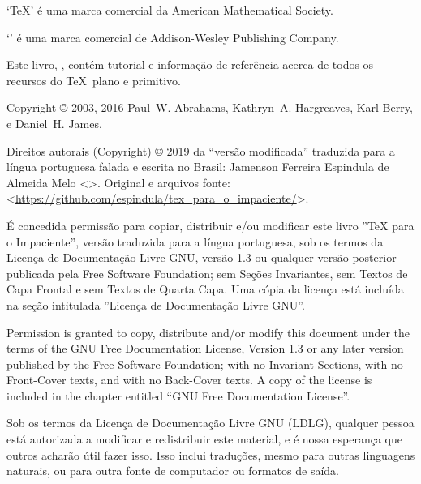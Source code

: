 



% 
\noheadlinetrue
\sinkage

\noindent `\TeX' é uma marca comercial da American Mathematical Society.

\noindent `\Metafont' é uma marca comercial de Addison-Wesley Publishing 
Company.

\bigskip
\noindent Este livro, \thisbook, contém tutorial e informação de 
referência acerca de todos os recursos do \TeX\ plano e primitivo.

\bigskip

\noindent Copyright \copyright{} 2003, 2016 Paul~W. Abrahams,
Kathryn~A. Hargreaves, Karl Berry, e Daniel~H. James.

\noindent Direitos autorais (Copyright) \copyright{} 2019 da 
``versão modificada'' traduzida para a língua portuguesa falada e 
escrita no Brasil: Jamenson Ferreira Espindula de Almeida Melo 
<>.
Original e arquivos fonte: 
<\url{https://github.com/espindula/tex_para_o_impaciente/}>.

\bigskip
\noindent   É concedida permissão para copiar, distribuir e/ou modificar 
este livro ''TeX para o Impaciente'', versão traduzida para a língua 
portuguesa, sob os termos da Licença de Documentação Livre GNU, versão 
1.3 ou qualquer versão posterior publicada pela Free Software 
Foundation; sem Seções Invariantes, sem Textos de Capa Frontal e sem 
Textos de Quarta Capa.   Uma cópia da licença está incluída na seção 
intitulada ''Licença de Documentação Livre GNU''.

\medskip\noindent
Permission is granted to copy, distribute and/or modify this
document under the terms of the GNU Free Documentation License, Version
1.3 or any later version published by the Free Software Foundation; with
no Invariant Sections, with no Front-Cover texts, and with no Back-Cover
texts.  A copy of the license is included in the chapter entitled ``GNU
Free Documentation License''.

\medskip\noindent
Sob os termos da Licença de Documentação Livre GNU (LDLG), qualquer 
pessoa está autorizada a modificar e redistribuir este material, e é 
nossa esperança que outros acharão útil fazer isso.  Isso inclui 
traduções, mesmo para outras linguagens naturais, ou para outra fonte de 
computador ou formatos de saída.


